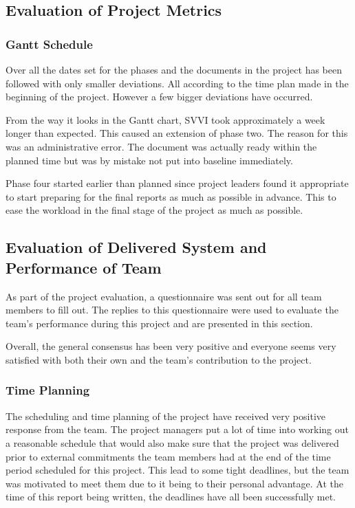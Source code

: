 \documentclass[a4paper]{article}
\begin{document}
\subsection{Evaluation of Project Metrics}
\label{sec:meval}

\subsubsection{Gantt Schedule}
Over all the dates set for the phases and the documents in the project has been followed with only smaller deviations. All according to the time plan made in the beginning of the project. However a few bigger deviations have occurred.

From the way it looks in the Gantt chart, SVVI took approximately a week longer than expected. This caused an extension of phase two. The reason for this was an administrative error. The document was actually ready within the planned time but was by mistake not put into baseline immediately. 

Phase four started earlier than planned since project leaders found it appropriate to start preparing for the final reports as much as possible in advance. This to ease the workload in the final stage of the project as much as possible.


\subsection{Evaluation of Delivered System and Performance of Team}
\label{sec:teval}
As part of the project evaluation, a questionnaire was sent out for all team members to fill out. The replies to this questionnaire were used to evaluate the team's performance during this project and are presented in this section. 

Overall, the general consensus has been very positive and everyone seems very satisfied with both their own and the team's contribution to the project.



\subsubsection{Time Planning}
The scheduling and time planning of the project have received very positive response from the team. The project managers put a lot of time into working out a reasonable schedule that would also make sure that the project was delivered prior to external commitments the team members had at the end of the time period scheduled for this project. This lead to some tight deadlines, but the team was motivated to meet them due to it being to their personal advantage. At the time of this report being written, the deadlines have all been successfully met. 
\end{document}
